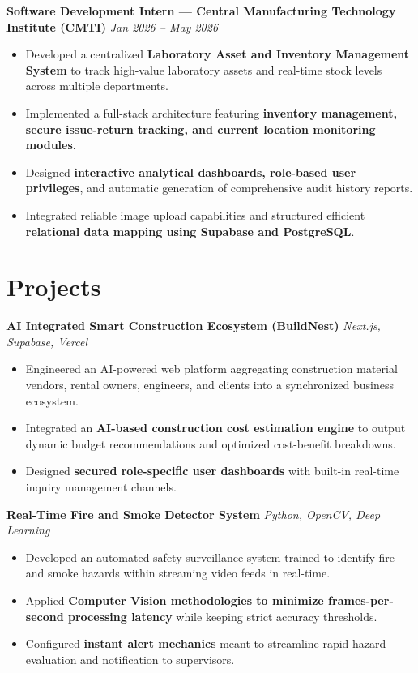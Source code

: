 \documentclass[11pt,a4paper]{article}
\newcommand{\resumeItem}[1]{\item \small #1}
\begin{document}
\textbf{Software Development Intern — Central Manufacturing Technology Institute (CMTI)} \hfill \textit{Jan 2026 -- May 2026}
\begin{itemize}
    \resumeItem{Developed a centralized \textbf{Laboratory Asset and Inventory Management System} to track high-value laboratory assets and real-time stock levels across multiple departments.}
    \resumeItem{Implemented a full-stack architecture featuring \textbf{inventory management, secure issue-return tracking, and current location monitoring modules}.}
    \resumeItem{Designed \textbf{interactive analytical dashboards, role-based user privileges}, and automatic generation of comprehensive audit history reports.}
    \resumeItem{Integrated reliable image upload capabilities and structured efficient \textbf{relational data mapping using Supabase and PostgreSQL}.}
\end{itemize}

\section*{Projects}

\textbf{AI Integrated Smart Construction Ecosystem (BuildNest)}
\hfill
\textit{Next.js, Supabase, Vercel}
\begin{itemize}
    \resumeItem{Engineered an AI-powered web platform aggregating construction material vendors, rental owners, engineers, and clients into a synchronized business ecosystem.}
    \resumeItem{Integrated an \textbf{AI-based construction cost estimation engine} to output dynamic budget recommendations and optimized cost-benefit breakdowns.}
    \resumeItem{Designed \textbf{secured role-specific user dashboards} with built-in real-time inquiry management channels.}
\end{itemize}

\textbf{Real-Time Fire and Smoke Detector System}
\hfill
\textit{Python, OpenCV, Deep Learning}
\begin{itemize}
    \resumeItem{Developed an automated safety surveillance system trained to identify fire and smoke hazards within streaming video feeds in real-time.}
    \resumeItem{Applied \textbf{Computer Vision methodologies to minimize frames-per-second processing latency} while keeping strict accuracy thresholds.}
    \resumeItem{Configured \textbf{instant alert mechanics} meant to streamline rapid hazard evaluation and notification to supervisors.}
\end{itemize}
\end{document}
